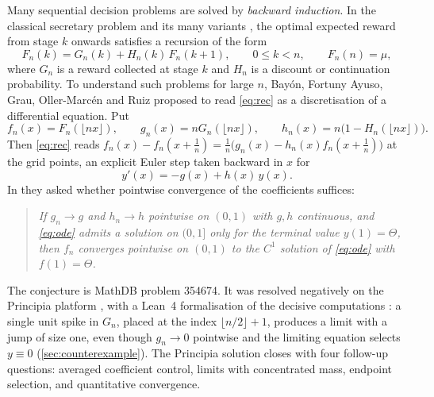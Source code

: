\documentclass[11pt]{article}
\theoremstyle{definition}
\theoremstyle{remark}
\newcommand{\1}{\mathbf{1}}
\newcommand{\fl}[1]{\lfloor #1\rfloor}
\begin{document}
Many sequential decision problems are solved by \emph{backward induction}. In the classical
secretary problem and its many variants \cite{GM66,Fer89}, the optimal expected reward from
stage $k$ onwards satisfies a recursion of the form
\begin{equation}\label{eq:rec}
F_n(k)=G_n(k)+H_n(k)\,F_n(k+1),\qquad 0\le k<n,\qquad F_n(n)=\mu,
\end{equation}
where $G_n$ is a reward collected at stage $k$ and $H_n$ is a discount or continuation
probability. To understand such problems for large $n$, Bay\'on, Fortuny Ayuso, Grau,
Oller-Marc\'en and Ruiz \cite{BFGOR23} proposed to read \eqref{eq:rec} as a discretisation
of a differential equation. Put
\begin{equation}\label{eq:scaled}
f_n(x)=F_n(\fl{nx}),\qquad g_n(x)=nG_n(\fl{nx}),\qquad h_n(x)=n\bigl(1-H_n(\fl{nx})\bigr).
\end{equation}
Then \eqref{eq:rec} reads $f_n(x)-f_n(x+\tfrac1n)=\tfrac1n\bigl(g_n(x)-h_n(x)f_n(x+\tfrac1n)\bigr)$
at the grid points, an explicit Euler step taken backward in $x$ for
\begin{equation}\label{eq:ode}
y'(x)=-g(x)+h(x)\,y(x).
\end{equation}
In \cite[Conjecture~1]{BFGOR23} they asked whether pointwise convergence of the coefficients
suffices:

\begin{quote}\itshape
If $g_n\to g$ and $h_n\to h$ pointwise on $(0,1)$ with $g,h$ continuous, and \eqref{eq:ode}
admits a solution on $(0,1]$ only for the terminal value $y(1)=\Theta$, then $f_n$ converges
pointwise on $(0,1)$ to the $C^1$ solution of \eqref{eq:ode} with $f(1)=\Theta$.
\end{quote}

The conjecture is MathDB problem 354674. It was resolved negatively on the Principia platform
\cite{Pri26}, with a Lean~4 formalisation of the decisive computations \cite{PriLean}: a single
unit spike in $G_n$, placed at the index $\fl{n/2}+1$, produces a limit with a jump of size one,
even though $g_n\to0$ pointwise and the limiting equation selects $y\equiv0$
(\cref{sec:counterexample}). The Principia solution closes with four follow-up questions:
averaged coefficient control, limits with concentrated mass, endpoint selection, and
quantitative convergence.
\end{document}
